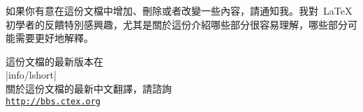 \noindent 如果你有意在這份文檔中增加、刪除或者改變一些內容，請通知我。我對~\LaTeX{}~
初學者的反饋特別感興趣，尤其是關於這份介紹哪些部分很容易理解，哪些部分可能需要更好地解釋。%
%

\bigskip
\begin{verse}
%
\end{verse}


\noindent 這份文檔的最新版本在\\
\CTAN|info/lshort|\\%

\smallskip
\noindent 關於這份文檔的最新中文翻譯，請諮詢\\
\href{http://bbs.ctex.org}{\texttt{http://bbs.ctex.org}}\\

\endinput



%


